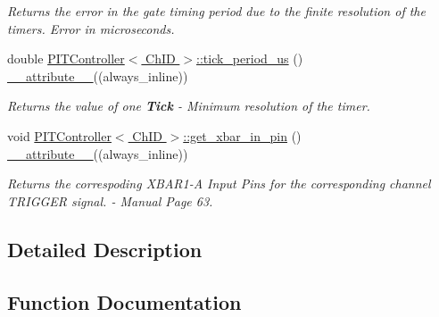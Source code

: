 \begin{DoxyCompactItemize}
\begin{DoxyCompactList}\small\item\em Returns the error in the gate timing period due to the finite resolution of the timers.  Error in microseconds. \end{DoxyCompactList}\item 
double \hyperlink{group__Controls_ga2b64ce8a01dc1254002c4ff3c384a6fd}{P\+I\+T\+Controller$<$ Ch\+I\+D $>$\+::tick\+\_\+period\+\_\+us} () \hyperlink{utilities_8hpp_a103d5b3998e0dd804213c8f30a094f4d}{\+\_\+\+\_\+attribute\+\_\+\+\_\+}((always\+\_\+inline))
\begin{DoxyCompactList}\small\item\em Returns the value of one {\bfseries Tick} -\/ Minimum resolution of the timer. \end{DoxyCompactList}\item 
void \hyperlink{group__Controls_ga19f11a8cdb94353ffaaa5a2eccf35ee5}{P\+I\+T\+Controller$<$ Ch\+I\+D $>$\+::get\+\_\+xbar\+\_\+in\+\_\+pin} () \hyperlink{utilities_8hpp_a103d5b3998e0dd804213c8f30a094f4d}{\+\_\+\+\_\+attribute\+\_\+\+\_\+}((always\+\_\+inline))
\begin{DoxyCompactList}\small\item\em Returns the correspoding X\+B\+A\+R1-\/A Input Pins for the corresponding channel T\+R\+I\+G\+G\+ER signal.  -\/ Manual Page 63. \end{DoxyCompactList}\end{DoxyCompactItemize}


\subsection{Detailed Description}


\subsection{Function Documentation}
\mbox{\label{group__Controls_ga19f11a8cdb94353ffaaa5a2eccf35ee5}} 
